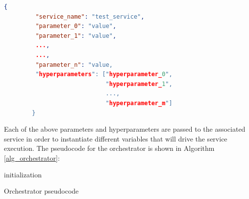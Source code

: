 \documentclass[\main/main.tex]{subfiles}
\begin{document}
\begin{center}
    \begin{lstlisting}[language=json, caption="Parameter message example", captionpos=b, label={parameter_message}]
        {
         "service_name": "test_service",
         "parameter_0": "value",
         "parameter_1": "value",
         ...,
         ...,
         "parameter_n": "value,
         "hyperparameters": ["hyperparameter_0", 
                             "hyperparameter_1", 
                             ..., 
                             "hyperparameter_m"]
        }
    \end{lstlisting}
\end{center}

Each of the above parameters and hyperparameters are passed to the associated service in order to instantiate different variables that will drive the service execution.
The pseudocode for the orchestrator is shown in Algorithm \ref{alg_orchestrator}:
\begin{center}
    \begin{algorithm}[H]
     initialization\;
    \caption{Orchestrator pseudocode}
    \label{alg_orchestrator}
    \end{algorithm}
    
\end{center}
\end{document}

